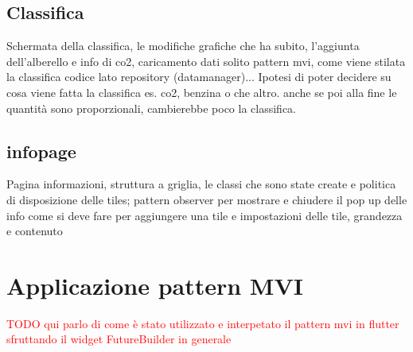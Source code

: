 \subsection{Classifica}
Schermata della classifica, le modifiche grafiche che ha subito, l'aggiunta dell'alberello e info di co2, caricamento dati solito pattern mvi, come viene stilata la classifica codice lato repository (datamanager)... Ipotesi di poter decidere su cosa viene fatta la classifica es. co2, benzina o che altro. anche se poi alla fine le quantità sono proporzionali, cambierebbe poco la classifica.

\subsection{infopage}
Pagina informazioni, struttura a griglia, le classi che sono state create e politica di disposizione delle tiles;  pattern observer per mostrare e chiudere il pop up delle info
come si deve fare per aggiungere una tile e impostazioni delle tile, grandezza e contenuto

\section{Applicazione pattern MVI}
\textcolor{red}{TODO qui parlo di come è stato utilizzato e interpetato il pattern mvi in flutter sfruttando il widget FutureBuilder in generale}
